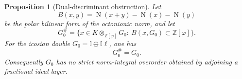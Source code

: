 \documentclass[10pt,a4paper]{amsart}
\newtheorem{proposition}{Proposition}
\newcommand{\Norm}{\operatorname{N}}
\newcommand{\Zphi}{\mathbb Z[\varphi]}
\begin{document}
\begin{proposition}[Dual-discriminant obstruction]
\label{prop:dual-discriminant}
Let
\begin{equation}
B(x,y)=\Norm(x+y)-\Norm(x)-\Norm(y)
\label{eq:norm-polar-pairing}
\end{equation}
be the polar bilinear form of the octonionic norm, and let
\begin{equation}
G_0^\#=\{x\in K\otimes_{\Zphi}G_0:\ B(x,G_0)\subset\Zphi\}.
\label{eq:g0-dual}
\end{equation}
For the icosian double \(G_0=\mathbb I\oplus\mathbb I\ell\), one has
\begin{equation}
G_0^\#=G_0.
\end{equation}
Consequently \(G_0\) has no strict norm-integral overorder obtained by adjoining a fractional ideal layer.
\end{proposition}
\end{document}
